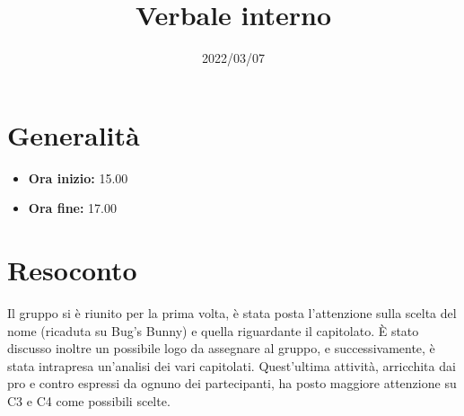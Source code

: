 \documentclass{classes/base}
\title{Verbale interno}
\date{2022/03/07}
\author{\giulio}
\renewcommand{\maketitle}{
    
}
\begin{document}
    \maketitle

    \section*{Generalità}
    \begin{itemize}
        \item \textbf{Ora inizio:} 15.00
        \item \textbf{Ora fine:} 17.00
    \end{itemize}

    \section*{Resoconto}
    Il gruppo si è riunito per la prima volta, è stata posta l'attenzione sulla scelta del nome (ricaduta su Bug's Bunny) e quella riguardante il capitolato.  
    È stato discusso inoltre un possibile logo da assegnare al gruppo, e successivamente, è stata intrapresa un'analisi dei vari capitolati.
    Quest'ultima attività, arricchita dai pro e contro espressi da ognuno dei partecipanti, ha posto maggiore attenzione su C3 e C4 come possibili scelte.
\end{document}
